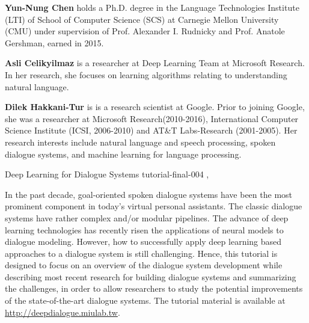 \begin{bio}
  {\bfseries Yun-Nung Chen} holds a Ph.D. degree in the Language Technologies
  Institute (LTI) of School of Computer Science (SCS) at Carnegie Mellon
  University (CMU) under supervision of Prof. Alexander I. Rudnicky and
  Prof. Anatole Gershman, earned in 2015.

  {\bfseries Asli Celikyilmaz} is a researcher at Deep Learning Team at
  Microsoft Research. In her research, she focuses on learning algorithms
  relating to understanding natural language.

  {\bfseries Dilek Hakkani-Tur} is is a research scientist at Google. Prior
  to joining Google, she was a researcher at Microsoft Research(2010-2016),
  International Computer Science Institute (ICSI, 2006-2010) and AT&T
  Labs-Research (2001-2005). Her research interests include natural language
  and speech processing, spoken dialogue systems, and machine learning for
  language processing.

\end{bio}

\begin{tutorial}
  {Deep Learning for Dialogue Systems}
  {tutorial-final-004}
  {\daydateyear, \tutorialafternoontime}
  {\TutLocD}

In the past decade, goal-oriented spoken dialogue systems have been the most
prominent component in today's virtual personal assistants. The classic
dialogue systems have rather complex and/or modular pipelines. The advance of
deep learning technologies has recently risen the applications of neural
models to dialogue modeling. However, how to successfully apply deep learning
based approaches to a dialogue system is still challenging. Hence, this
tutorial is designed to focus on an overview of the dialogue system
development while describing most recent research for building dialogue
systems and summarizing the challenges, in order to allow researchers to
study the potential improvements of the state-of-the-art dialogue systems. The
tutorial material is available at \url{http://deepdialogue.miulab.tw}.

\end{tutorial}